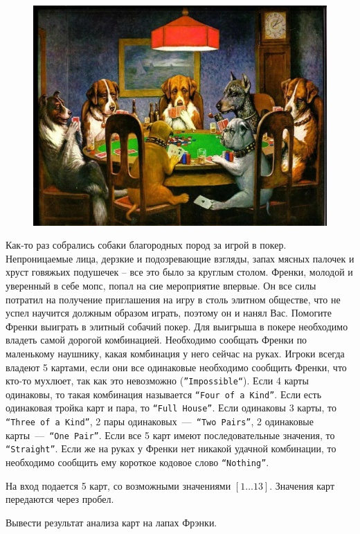 \begin{figure}[h!]
	\centering
	\includegraphics[width=0.8\linewidth, keepaspectratio]{poker.jpg}
\end{figure}

Как-то раз собрались собаки благородных пород за игрой в покер. 
Непроницаемые лица, дерзкие и подозревающие взгляды, запах мясных палочек и хруст говяжьих подушечек – все это было за круглым столом. 
Френки, молодой и уверенный в себе мопс, попал на сие мероприятие впервые. 
Он все силы потратил на получение приглашения на игру в столь элитном обществе, что не успел научится должным образом играть, поэтому он и нанял Вас. 
Помогите Френки выиграть в элитный собачий покер. Для выигрыша в покере необходимо владеть самой дорогой комбинацией. 
Необходимо сообщать Френки по маленькому наушнику, какая комбинация у него сейчас на руках. 
Игроки всегда владеют 5 картами, если они все одинаковые необходимо сообщить Френки, что кто-то мухлюет, так как это невозможно (\texttt{''Impossible``}). 
Если 4 карты одинаковы, то такая комбинация называется \texttt{``Four of a Kind''}. 
Если есть одинаковая тройка карт и пара, то \texttt{``Full House''}. 
Если одинаковы 3 карты, то \texttt{``Three of a Kind''}, 2 пары одинаковых~---~\texttt{``Two Pairs''}, 2 одинаковые карты~---~\texttt{``One Pair''}. 
Если все 5 карт имеют последовательные значения, то \texttt{``Straight''}. 
Если же на руках у Френки нет никакой удачной комбинации, то необходимо сообщить ему короткое кодовое слово \texttt{``Nothing''}.

\InputFile
\noindent

На вход подается 5 карт, со возможными значениями $[1 \ldots 13]$. Значения карт передаются через пробел.

\OutputFile
\noindent

Вывести результат анализа карт на лапах Фрэнки.

\SAMPLES